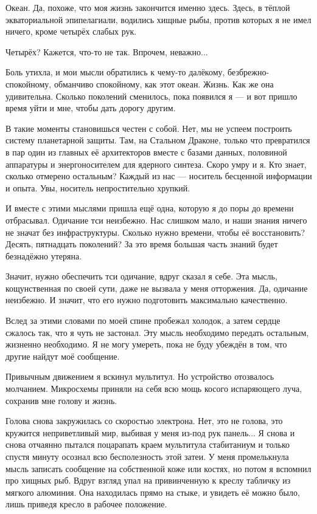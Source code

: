 Океан.
Да, похоже, что моя жизнь закончится именно здесь.
Здесь, в тёплой экваториальной эпипелагиали, водились хищные рыбы, против которых я не имел ничего, кроме четырёх слабых рук.

Четырёх?
Кажется, что-то не так.
Впрочем, неважно...

Боль утихла, и мои мысли обратились к чему-то далёкому, безбрежно-спокойному, обманчиво спокойному, как этот океан.
Жизнь.
Как же она удивительна.
Сколько поколений сменилось, пока появился я --- и вот пришло время уйти и мне, чтобы дать дорогу другим.

В такие моменты становишься честен с собой.
Нет, мы не успеем построить систему планетарной защиты.
Там, на Стальном Драконе, только что превратился в пар один из главных её архитекторов вместе с базами данных, половиной аппаратуры и энергоносителем для ядерного синтеза.
Скоро умру и я.
Кто знает, сколько отмерено остальным?
Каждый из нас --- носитель бесценной информации и опыта.
Увы, носитель непростительно хрупкий.

И вместе с этими мыслями пришла ещё одна, которую я до поры до времени отбрасывал.
Одичание тси неизбежно.
Нас слишком мало, и наши знания ничего не значат без инфраструктуры.
Сколько нужно времени, чтобы её восстановить?
Десять, пятнадцать поколений?
За это время большая часть знаний будет безнадёжно утеряна.

Значит, нужно обеспечить тси одичание, вдруг сказал я себе.
Эта мысль, кощунственная по своей сути, даже не вызвала у меня отторжения.
Да, одичание неизбежно.
И значит, что его нужно подготовить максимально качественно.

Вслед за этими словами по моей спине пробежал холодок, а затем сердце сжалось так, что я чуть не застонал.
Эту мысль необходимо передать остальным, жизненно необходимо.
Я не могу умереть, пока не буду убеждён в том, что другие найдут моё сообщение.

Привычным движением я вскинул мультитул.
Но устройство отозвалось молчанием.
Микросхемы приняли на себя всю мощь косого испаряющего луча, сохранив мне голову и жизнь.

Голова снова закружилась со скоростью электрона.
Нет, это не голова, это кружится неприветливый мир, выбивая у меня из-под рук панель...
Я снова и снова отчаянно пытался поцарапать краем мультитула стабитаниум и только спустя минуту осознал всю бесполезность этой затеи.
У меня промелькнула мысль записать сообщение на собственной коже или костях, но потом я вспомнил про хищных рыб.
Вдруг взгляд упал на привинченную к креслу табличку из мягкого алюминия.
Она находилась прямо на стыке, и увидеть её можно было, лишь приведя кресло в рабочее положение.

